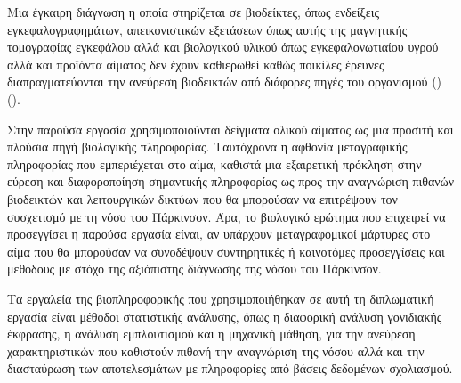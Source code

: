 \documentclass[12pt]{report}
\begin{document}
        Μια έγκαιρη διάγνωση η οποία στηρίζεται σε βιοδείκτες, όπως ενδείξεις εγκεφαλογραφημάτων, απεικονιστικών εξετάσεων όπως αυτής της μαγνητικής τομογραφίας εγκεφάλου αλλά και βιολογικού υλικού όπως εγκεφαλονωτιαίου υγρού αλλά και προϊόντα αίματος δεν έχουν καθιερωθεί καθώς ποικίλες έρευνες διαπραγματεύονται την ανεύρεση βιοδεικτών από διάφορες πηγές του οργανισμού (\emph{\cite{Miller2015BiomarkersFuture}}) (\emph{\cite{Maitin2022SurveyReview}}).
    \par
        Στην παρούσα εργασία χρησιμοποιούνται δείγματα ολικού αίματος ως μια προσιτή και πλούσια πηγή βιολογικής πληροφορίας. Ταυτόχρονα η αφθονία μεταγραφικής πληροφορίας που εμπεριέχεται στο αίμα, καθιστά μια εξαιρετική πρόκληση στην εύρεση και διαφοροποίηση σημαντικής πληροφορίας ως προς την αναγνώριση πιθανών βιοδεικτών και λειτουργικών δικτύων που θα μπορούσαν να επιτρέψουν τον συσχετισμό με τη νόσο του Πάρκινσον. Άρα, το βιολογικό ερώτημα που επιχειρεί να προσεγγίσει η παρούσα εργασία είναι, αν υπάρχουν μεταγραφομικοί μάρτυρες στο αίμα που θα μπορούσαν να συνοδέψουν συντηρητικές ή καινοτόμες προσεγγίσεις και μεθόδους με στόχο της αξιόπιστης διάγνωσης της νόσου του Πάρκινσον.
    \par
        Τα εργαλεία της βιοπληροφορικής που χρησιμοποιήθηκαν σε αυτή τη διπλωματική εργασία είναι μέθοδοι στατιστικής ανάλυσης, όπως η διαφορική ανάλυση γονιδιακής έκφρασης, η ανάλυση εμπλουτισμού και η μηχανική μάθηση, για την ανεύρεση χαρακτηριστικών που καθιστούν πιθανή την αναγνώριση της νόσου αλλά και την διασταύρωση των αποτελεσμάτων με πληροφορίες από βάσεις δεδομένων σχολιασμού.
        
    \cleardoublepage
\end{document}
